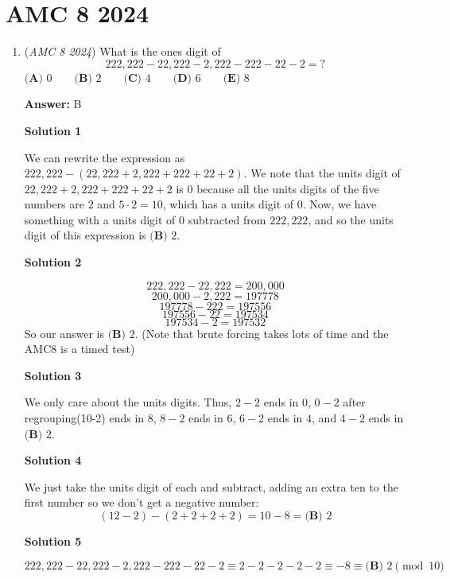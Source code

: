 \section{AMC 8 2024}
        \begin{enumerate}
        	\item (\textit{AMC 8 2024}) What is the ones digit of 
 \[222{,}222-22{,}222-2{,}222-222-22-2=?\]
$\textbf{(A) } 0\qquad\textbf{(B) } 2\qquad\textbf{(C) } 4\qquad\textbf{(D) } 6\qquad\textbf{(E) } 8$

 \textbf{Answer: }B



\textbf{Solution 1}

We can rewrite the expression as $222,222-(22,222+2,222+222+22+2)$. We note that the units digit of $22,222+2,222+222+22+2$ is $0$ because all the units digits of the five numbers are $2$ and $5\cdot2=10$, which has a units digit of $0$. Now, we have something with a units digit of $0$ subtracted from $222,222$, and so the units digit of this expression is $\boxed{\textbf{(B) } 2}$.

 



\textbf{Solution 2}


 \[222,222-22,222 = 200,000\]
 \[200,000 - 2,222 = 197778\]
 \[197778 - 222 = 197556\]
 \[197556 - 22 = 197534\]
 \[197534 - 2 = 197532\]So our answer is $\boxed{\textbf{(B) } 2}$. (Note that brute forcing takes lots of time and the AMC8 is a timed test)

 



\textbf{Solution 3}

We only care about the units digits. Thus, $2-2$ ends in $0$, $0-2$ after regrouping(10-2) ends in $8$, $8-2$ ends in $6$, $6-2$ ends in $4$, and $4-2$ ends in $\boxed{\textbf{(B) } 2}$.

 



\textbf{Solution 4}

We just take the units digit of each and subtract, adding an extra ten to the first number so we don't get a negative number:
 \[(12-2)-(2+2+2+2)=10-8=\boxed{\textbf{(B) } 2}\]




\textbf{Solution 5}


 \[222{,}222-22{,}222-2{,}222-222-22-2\equiv2-2-2-2-2\equiv-8\equiv\boxed{\textbf{(B) } 2}\pmod{10}\]





\end{enumerate}
